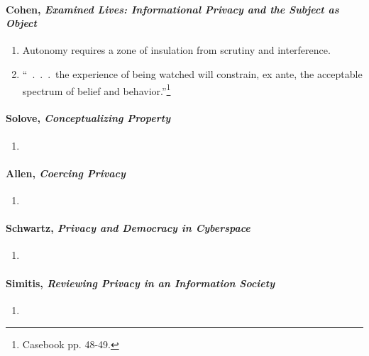 \paragraph{Cohen, \emph{Examined Lives: Informational Privacy and the Subject 
as Object}}

\begin{enumerate}
    \item Autonomy requires a zone of insulation from scrutiny and 
    interference.
    \item ``~.~.~.~the experience of being watched will constrain, ex ante, 
    the acceptable spectrum of belief and behavior.''\footnote{Casebook pp. 
    48-49.}
\end{enumerate}

\paragraph{Solove, \emph{Conceptualizing Property}}

\begin{enumerate}
    \item %
\end{enumerate}

\paragraph{Allen, \emph{Coercing Privacy}}

\begin{enumerate}
    \item %
\end{enumerate}

\paragraph{Schwartz, \emph{Privacy and Democracy in Cyberspace}}

\begin{enumerate}
    \item %
\end{enumerate}

\paragraph{Simitis, \emph{Reviewing Privacy in an Information Society}}

\begin{enumerate}
    \item %
\end{enumerate}

